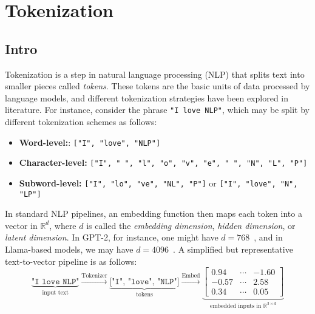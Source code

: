 %
\chapter{Tokenization}
%

\section{Intro}


Tokenization is a step in natural language processing (NLP) that splits text into smaller pieces called \textit{tokens}.
These tokens are the basic units of data processed by language models, and different tokenization strategies have been explored in literature.
For instance, consider the phrase \texttt{"I love NLP"}, which may be split by different tokenization schemes as follows:
\begin{itemize}
    \item \textbf{Word-level:}: \texttt{["I", "love", "NLP"]}

    \item \textbf{Character-level:} \texttt{["I", " ", "l", "o", "v", "e", " ", "N", "L", "P"]}

    \item \textbf{Subword-level:} \texttt{["I", "lo", "ve", "NL", "P"]} or \texttt{["I", "love", "N", "LP"]}

\end{itemize}
In standard NLP pipelines, an embedding function then maps each token into a vector in \(\mathbb{R}^{d}\), where \(d\) is called the \textit{embedding dimension}, \textit{hidden dimension}, or \textit{latent dimension}.
In GPT-2, for instance, one might have \(d = 768\)~\citep{radford2019language}, and in Llama-based models, we may have \(d = 4096\)~\citep{touvron2023llama}.
A simplified but representative text-to-vector pipeline is as follows:
\begin{equation*}
    \underbrace{\texttt{"I love NLP"}}_{\text{input text}}
    \xrightarrow{\text{Tokenizer}}
    \underbrace{\texttt{["I", "love", "NLP"]}}_{\text{tokens}}
    \xrightarrow{\text{Embed}}
    \underbrace{
        \begin{bmatrix}
            0.94   & \cdots & - 1.60 \\
            - 0.57 & \cdots & 2.58   \\
            0.34   & \cdots & 0.05
        \end{bmatrix}
    }_{\text{embedded inputs in \(\mathbb{R}^{3 \times d}\)}}
\end{equation*}

